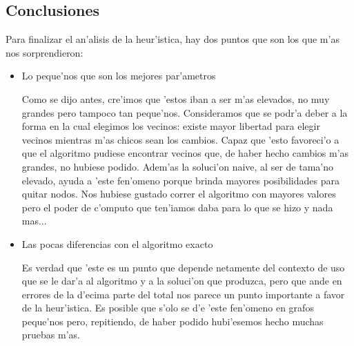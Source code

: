 \subsection{Conclusiones}
Para finalizar el an'alisis de la heur'istica, hay dos puntos que son los que m'as nos sorprendieron:
\begin{itemize}
\item Lo peque'nos que son los mejores par'ametros

Como se dijo antes, cre'imos que 'estos iban a ser m'as elevados, no muy grandes pero tampoco tan peque'nos. Consideramos que se podr'a deber a la forma en la cual elegimos los vecinos: existe mayor libertad para elegir vecinos mientras m'as chicos sean los cambios. Capaz que 'esto favoreci'o a que el algoritmo pudiese encontrar vecinos que, de haber hecho cambios m'as grandes, no hubiese podido. Adem'as la soluci'on naive, al ser de tama'no elevado, ayuda a 'este fen'omeno porque brinda mayores posibilidades para quitar nodos. Nos hubiese gustado correr el algoritmo con mayores valores pero el poder de c'omputo que ten'iamos daba para lo que se hizo y nada mas...

\item Las pocas diferencias con el algoritmo exacto

Es verdad que 'este es un punto que depende netamente del contexto de uso que se le dar'a al algoritmo y a la soluci'on que produzca, pero que ande en errores de la d'ecima parte del total nos parece un punto importante a favor de la heur'istica. Es posible que s'olo se d'e 'este fen'omeno en grafos peque'nos pero, repitiendo, de haber podido hubi'esemos hecho muchas pruebas m'as.
\end{itemize}
